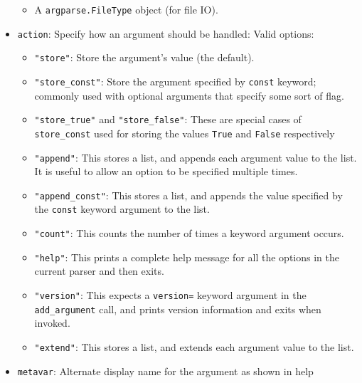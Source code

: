 \documentclass[a4paper,12pt,%
              final%
              ]{article}
\begin{document}
\begin{itemize}
\begin{itemize}
      \item A \verb|argparse.FileType| object (for file IO).
    \end{itemize}
  \item \texttt{action}: Specify how an argument should be handled: Valid options:
    \begin{itemize}
      \item \verb|"store"|: Store the argument's value (the default).
      \item \verb|"store_const"|: Store the argument specified by \texttt{const} keyword; commonly used with optional arguments that specify some sort of flag.
      \item \verb|"store_true"| and \verb|"store_false"|: These are special cases of \verb|store_const| used for storing the values \texttt{True} and \texttt{False} respectively
      \item \verb|"append"|: This stores a list, and appends each argument value to the list. It is useful to allow an option to be specified multiple times.
      \item \verb|"append_const"|: This stores a list, and appends the value specified by the \texttt{const} keyword argument to the list.
      \item \verb|"count"|: This counts the number of times a keyword argument occurs.
      \item \verb|"help"|: This prints a complete help message for all the options in the current parser and then exits.
      \item \verb|"version"|: This expects a \verb|version=| keyword argument in the \verb|add_argument| call, and prints version information and exits when invoked.
      \item \verb|"extend"|: This stores a list, and extends each argument value to the list.
    \end{itemize}
  \item \texttt{metavar}: Alternate display name for the argument as shown in help
\end{itemize}
\end{document}
